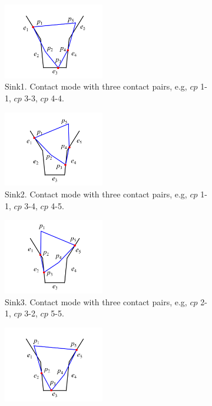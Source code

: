 \begin{figure}
\begin{center}
\begin{subfigure}[t]{0.24\textwidth}
\begin{center}
\includegraphics[height=1.3in]{figures/5_5_sink1.png}
\end{center}
\label{fig:5_5_sink1}
\caption{Sink1. Contact mode with three contact pairs, e.g, ${cp}$ 1-1, ${cp}$ 3-3, ${cp}$ 4-4. }
\end{subfigure}
\begin{subfigure}[t]{0.24\textwidth}
\begin{center}
\includegraphics[height=1.3in]{figures/5_5_sink2.png}
\end{center}
\label{fig:5_5_sink2}
\caption{Sink2. Contact mode with three contact pairs, e.g, ${cp}$ 1-1, ${cp}$ 3-4, ${cp}$ 4-5. }
\end{subfigure}
\begin{subfigure}[t]{0.24\textwidth}
\begin{center}
\includegraphics[height=1.3in]{figures/5_5_sink3.png}
\end{center}
\label{fig:5_5_sink3}
\caption{Sink3. Contact mode with three contact pairs, e.g, ${cp}$ 2-1, ${cp}$ 3-2, ${cp}$ 5-5. }
\end{subfigure}
\begin{subfigure}[t]{0.24\textwidth}
\begin{center}
\includegraphics[height=1.3in]{figures/5_5_sink4.png}

\end{center}
\end{subfigure}
\end{center}
\end{figure}
